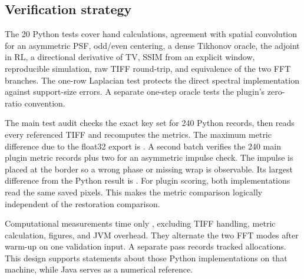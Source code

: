 \subsection{Verification strategy}

The 20 Python tests cover hand calculations, agreement with spatial convolution for an asymmetric PSF, odd/even centering, a dense Tikhonov oracle, the adjoint in RL, a directional derivative of TV, SSIM from an explicit window, reproducible simulation, raw TIFF round-trip, and equivalence of the two FFT branches. The one-row Laplacian test protects the direct spectral implementation against support-size errors. A separate one-step oracle tests the plugin's zero-ratio convention.

The main test audit checks the exact key set for 240 Python records, then reads every referenced TIFF and recomputes the metrics. The maximum metric difference due to the float32 export is \PythonMetricError. A second batch verifies the 240 main plugin metric records plus two for an asymmetric impulse check. The impulse is placed at the border so a wrong phase or missing wrap is observable. Its largest difference from the Python result is \ProbeError. For plugin scoring, both implementations read the same saved pixels. This makes the metric comparison logically independent of the restoration comparison.

Computational measurements time only , excluding TIFF handling, metric calculation, figures, and JVM overhead. They alternate the two FFT modes after warm-up on one validation input. A separate  pass records tracked allocations. This design supports statements about those Python implementations on that machine, while Java serves as a numerical reference.
